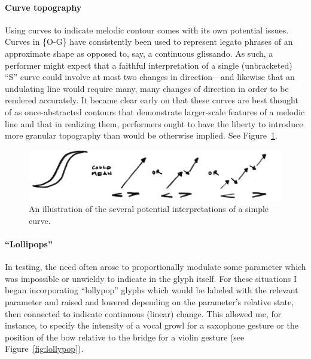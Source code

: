     \paragraph{Curve topography} Using curves to indicate melodic contour comes with its own potential issues. Curves in \{O-G\} have consistently been used to represent legato phrases of an approximate shape as opposed to, say, a continuous glissando. As such, a performer might expect that a faithful interpretation of a single (unbracketed) ``S'' curve could involve at most two changes in direction---and likewise that an undulating line would require many, many changes of direction in order to be rendered accurately. It became clear early on that these curves are best thought of as once-abstracted contours that demonstrate larger-scale features of a melodic line and that in realizing them, performers ought to have the liberty to introduce more granular topography than would be otherwise implied. See Figure~\ref{fig:curvebreakdown}.

    \begin{figure}
        \centering
        \includegraphics[width=.8\textwidth]{images/chapter4/01-curvebreakdown.png}
        \captionsetup{width=.5\textwidth}
        \caption[An illustration of the several potential interpretations of a simple curve.]{An illustration of the several potential interpretations of a simple curve.\footnotemark}
        \label{fig:curvebreakdown}
    \end{figure}


    \paragraph{``Lollipops''} In testing, the need often arose to proportionally modulate some parameter which was impossible or unwieldy to indicate in the glyph itself. For these situations I began incorporating ``lollypop'' glyphs which would be labeled with the relevant parameter and raised and lowered depending on the parameter's relative state, then connected to indicate continuous (linear) change. This allowed me, for instance, to specify the intensity of a vocal growl for a saxophone gesture or the position of the bow relative to the bridge for a violin gesture (see Figure~\ref{fig:lollypop}).

